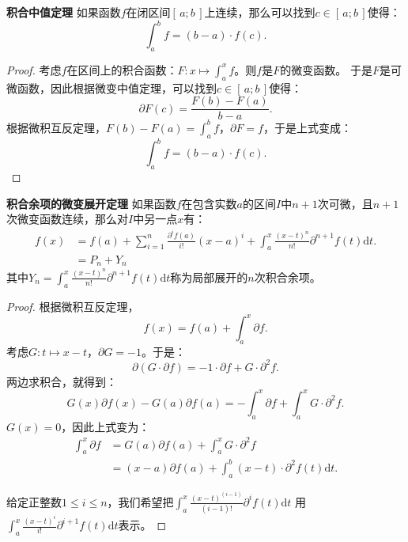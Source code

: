 \documentclass[12pt,UTF8,fontset=none]{ctexbook}
\begin{document}
\begin{appendix}
\begin{tm}{\textbf{积合中值定理}}
    如果函数$f$在闭区间$[\,a; b\,]$上连续，那么可以找到$c\in[\,a;b\,]$使得：
    $$ \int_a^b f = (b - a)\cdot f(c).$$
\end{tm}

\begin{proof}
    考虑$f$在区间上的积合函数：$F: x\mapsto \int_a^x f$。则$f$是$F$的微变函数。
    于是$F$是可微函数，因此根据微变中值定理，可以找到$c\in[\,a;b\,]$使得：
    $$ \partial F(c) = \frac{F(b) - F(a)}{b - a}.$$
    根据微积互反定理，$F(b) - F(a) = \int_a^b f$，$\partial F = f$，于是上式变成：
    $$ \int_a^b f = (b - a)\cdot f(c).$$
\end{proof}

\begin{tm}{\textbf{积合余项的微变展开定理}}
    如果函数$f$在包含实数$a$的区间$I$中$n+1$次可微，且$n+1$次微变函数连续，那么对$I$中另一点$x$有：
    \begin{align*}
        f(x) &= f(a) + \sum_{i=1}^n \frac{\partial^i f(a)}{i!} (x - a)^i + \int_a^x \frac{(x - t)^{n}}{n!} \partial^{n+1} f(t)\mathrm{d}t. \\
        &= P_n + Y_n 
    \end{align*}
    其中$Y_n = \int_a^x \frac{(x - t)^{n}}{n!} \partial^{n+1} f(t)\mathrm{d}t$称为局部展开的$n$次积合余项。
\end{tm}

\begin{proof}
    根据微积互反定理，
    $$ f(x) = f(a) + \int_a^x \partial f .$$
    考虑$G : t \mapsto x - t $，$\partial G = -1$。于是：
    $$ \partial (G\cdot \partial f) = -1 \cdot \partial f + G \cdot \partial^2 f. $$
    两边求积合，就得到：
    $$ G(x) \partial f(x) - G(a) \partial f(a) = - \int_a^x \partial f + \int_a^x G \cdot \partial^2 f. $$
    $G(x) = 0$，因此上式变为：
    \begin{align*}
        \int_a^x \partial f &=  G(a) \partial f(a) + \int_a^x G \cdot \partial^2 f \\
        &= (x - a) \partial f(a) + \int_a^b (x - t) \cdot \partial^2 f(t)\mathrm{d}t. 
    \end{align*}
    
    给定正整数$1\leqslant i \leqslant n$，我们希望把$\int_a^x \frac{(x - t)^{(i-1)}}{(i-1)!} \partial^{i} f(t)\mathrm{d}t$
    用$\int_a^x \frac{(x - t)^{i}}{i!} \partial^{i+1} f(t)\mathrm{d}t$表示。


\end{proof}
\end{appendix}
\end{document}
